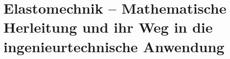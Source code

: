 %
%
%
%
\chapter{Elastomechnik – Mathematische Herleitung und ihr Weg in die ingenieurtechnische Anwendung\label{chapter:elastomechanik}}
\begin{refsection}








\printbibliography[heading=subbibliography]
\end{refsection}